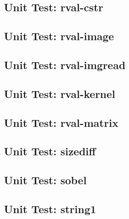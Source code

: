 \subsection*{Unit Test: rval-cstr}

 \clearpage
\subsection*{Unit Test: rval-image}

 \clearpage
\subsection*{Unit Test: rval-imgread}

 \clearpage
\subsection*{Unit Test: rval-kernel}

 \clearpage
\subsection*{Unit Test: rval-matrix}

 \clearpage
\subsection*{Unit Test: sizediff}

 \clearpage
\subsection*{Unit Test: sobel}

 \clearpage
\subsection*{Unit Test: string1}

 \clearpage
